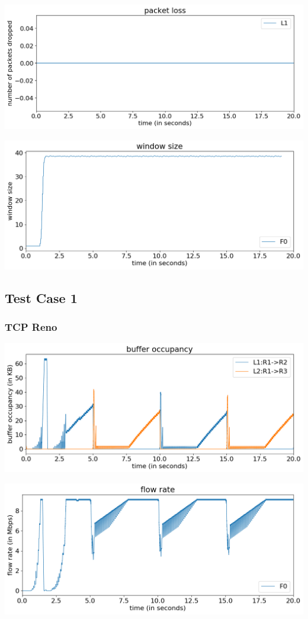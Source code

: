 \documentclass{article}
\begin{document}
\includegraphics[width = \textwidth]{"test_case0_fast packet loss"}

\includegraphics[width = \textwidth]{"test_case0_fast window size"}



\subsection{Test Case 1}

\subsubsection{TCP Reno}

\includegraphics[width = \textwidth]{"test_case1_reno buffer occupancy"}

\includegraphics[width = \textwidth]{"test_case1_reno flow rate"}
\end{document}
